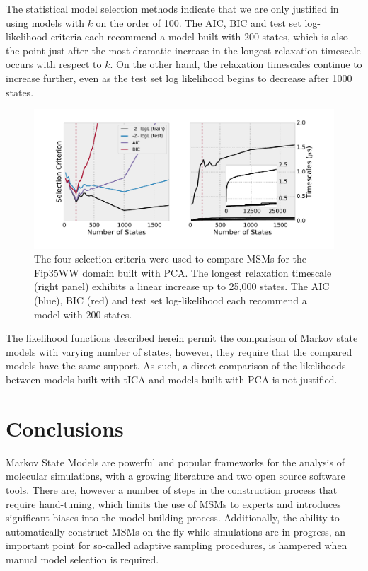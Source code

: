 \documentclass[journal=jpcbfk, layout=traditional, manuscript=article]{achemso}
\begin{document}
The statistical model selection methods indicate that we are only justified in using models with $k$ on the order of 100. The AIC, BIC and test set log-likelihood criteria each recommend a model built with 200 states, which is also the point just after the most dramatic increase in the longest relaxation timescale occurs with respect to $k$. On the other hand, the relaxation timescales continue to increase further, even as the test set log likelihood begins to decrease after 1000 states.


\begin{figure}
\centering
\includegraphics[width=6in]{figs/ww_pca/ww_pca.pdf}
\caption{The four selection criteria were used to compare MSMs for the Fip35WW domain built with PCA. The longest relaxation timescale (right panel) exhibits a linear increase up to 25,000 states. The AIC (blue), BIC (red) and test set log-likelihood each recommend a model with 200 states.\label{fig:ww-pca}} 
\end{figure}

The likelihood functions described herein permit the comparison of Markov state models with varying number of states, however, they require that the compared models have the same support. As such, a direct comparison of the likelihoods between models built with tICA and models built with PCA is not justified.

\section{Conclusions}

Markov State Models are powerful and popular frameworks for the analysis of molecular simulations, with a growing literature and two open source software tools\cite{Beauchamp2011Msmbuilder2, Senne2012EMMA}. There are, however a number of steps in the construction process that require hand-tuning, which limits the use of MSMs to experts and introduces significant biases into the model building process. Additionally, the ability to automatically construct MSMs on the fly while simulations are in progress, an important point for so-called adaptive sampling procedures\cite{Bowman2010Enhanced}, is hampered when manual model selection is required. 
\end{document}
